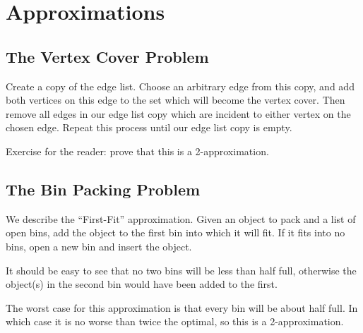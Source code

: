 \chapter{Approximations}

\section{The Vertex Cover Problem}

Create a copy of the edge list.  Choose an arbitrary edge from this
copy, and add both vertices on this edge to the set which will become
the vertex cover.  Then remove all edges in our edge list copy which
are incident to either vertex on the chosen edge.  Repeat this process
until our edge list copy is empty.

Exercise for the reader: prove that this is a 2-approximation.

\section{The Bin Packing Problem}

We describe the ``First-Fit'' approximation.  Given an object to pack
and a list of open bins, add the object to the first bin into which it
will fit.  If it fits into no bins, open a new bin and insert the object.

It should be easy to see that no two bins will be less than half full,
otherwise the object(s) in the second bin would have been added to the
first.

The worst case for this approximation is that every bin will be about
half full.  In which case it is no worse than twice the optimal, so
this is a 2-approximation.
